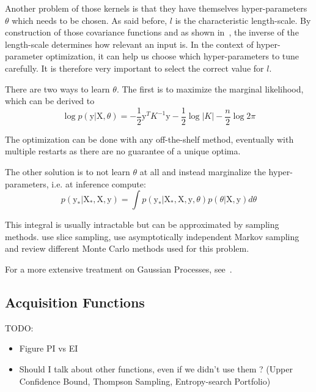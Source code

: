 Another problem of those kernels is that they have themselves hyper-parameters $\theta$ which needs to be chosen. As said before, $l$ is the characteristic length-scale. By construction of those covariance functions and as shown in~\textcite{neal1996phd}, the inverse of the length-scale determines how relevant an input is. In the context of hyper-parameter optimization, it can help us choose which hyper-parameters to tune carefully. It is therefore very important to select the correct value for $l$. 

There are two ways to learn $\theta$. The first is to maximize the marginal likelihood, which can be derived to  
\begin{equation}
	\log p\left(\mathrm{y} | \mathrm{X}, \theta \right) = - \frac{1}{2} \mathrm{y}^T K^{-1} \mathrm{y} - \frac{1}{2} \log |K| - \frac{n}{2} \log 2 \pi
\end{equation}

The optimization can be done with any off-the-shelf method, eventually with multiple restarts as there are no guarantee of a unique optima. 

The other solution is to not learn $\theta$ at all and instead marginalize the hyper-parameters, i.e. at inference compute:
\begin{equation}
    p\left( \mathrm{y_*} | \mathrm{X_*}, \mathrm{X}, \mathrm{y} \right)
    = \int p\left( \mathrm{y_*} | \mathrm{X_*}, \mathrm{X}, \mathrm{y}, \theta \right) p \left( \theta | \mathrm{X}, \mathrm{y} \right) d\theta
\end{equation}

This integral is usually intractable but can be approximated by sampling methods. \textcite{murray2010NIPS} use slice sampling, \textcite{garbuno2016CSDA} use asymptotically independent Markov sampling and \textcite{titsias2011} review different Monte Carlo methods used for this problem.

For a more extensive treatment on Gaussian Processes, see~\textcite{rasmussen2005}.

\subsection{Acquisition Functions}
\label{ssec:acqfunc}

TODO:
\begin{itemize}
    \item Figure PI vs EI
    \item Should I talk about other functions, even if we didn't use them ? (Upper Confidence Bound, Thompson Sampling, Entropy-search Portfolio)
\end{itemize}

